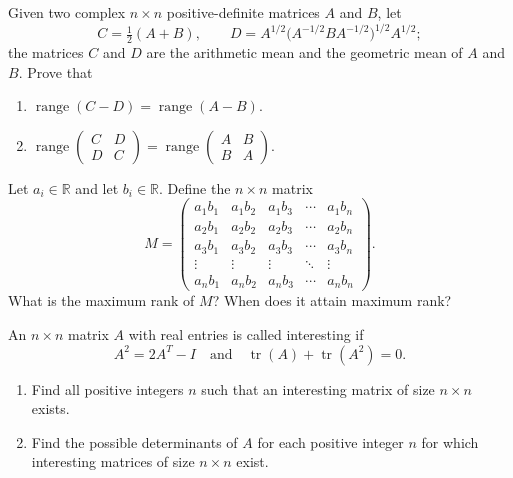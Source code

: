 \documentclass[12pt]{article}
\begin{document}
\begin{problem}
Given two complex $n\times n$ positive-definite matrices $A$ and $B$, let
\[
C=\tfrac12(A+B), \qquad D = A^{1/2}\big(A^{-1/2}BA^{-1/2}\big)^{1/2}A^{1/2};
\]
the matrices $C$ and $D$ are the arithmetic mean and the geometric mean of $A$ and $B$. Prove that
\begin{enumerate}[label=(\alph*)]
\item $\operatorname{range}(C-D) = \operatorname{range}(A-B)$.
\item $\operatorname{range}\begin{pmatrix}C & D\\ D & C\end{pmatrix} = \operatorname{range}\begin{pmatrix}A & B\\ B & A\end{pmatrix}$.
\end{enumerate}
\end{problem}

\begin{problem}
Let $a_i\in\mathbb{R}$ and let $b_i\in\mathbb{R}$. Define the $n\times n$ matrix
\[
M = \begin{pmatrix}
a_1b_1 & a_1b_2 & a_1b_3 & \cdots & a_1b_n\\
a_2b_1 & a_2b_2 & a_2b_3 & \cdots & a_2b_n\\
a_3b_1 & a_3b_2 & a_3b_3 & \cdots & a_3b_n\\
\vdots & \vdots & \vdots & \ddots & \vdots\\
a_nb_1 & a_nb_2 & a_nb_3 & \cdots & a_nb_n
\end{pmatrix}.
\]
What is the maximum rank of $M$? When does it attain maximum rank?
\end{problem}

\begin{problem}
An $n\times n$ matrix $A$ with real entries is called interesting if
\[
A^2 = 2A^T - I \quad\text{and}\quad \operatorname{tr}(A)+\operatorname{tr}(A^2) = 0.
\]
\begin{enumerate}[label=\alph*.]
\item Find all positive integers $n$ such that an interesting matrix of size $n\times n$ exists.
\item Find the possible determinants of $A$ for each positive integer $n$ for which interesting matrices of size $n\times n$ exist.
\end{enumerate}
\end{problem}
\end{document}
